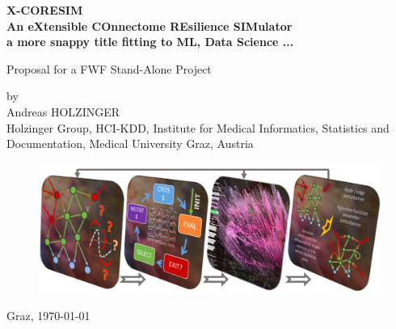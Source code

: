\documentclass[a4paper,11pt]{article}
\begin{document}
\begin{titlepage}
\begin{center}
\bfseries\Large
X-CORESIM\\ 
An eXtensible COnnectome REsilience SIMulator \\
 a more snappy title fitting to ML, Data Science ...
\\[0,6cm]
\normalfont\normalsize

Proposal for a FWF Stand-Alone Project

by\\
Andreas HOLZINGER\\

Holzinger Group, HCI-KDD, Institute for Medical Informatics, Statistics and Documentation,
Medical University Graz, Austria
\\[0,4cm]
\begin{figure}[ht]
	\includegraphics[width=\textwidth]{images/Pipeline}
\end{figure}
%
Graz, \today

\end{center}
\vspace{0.5\baselineskip}
\end{titlepage}
\end{document}
